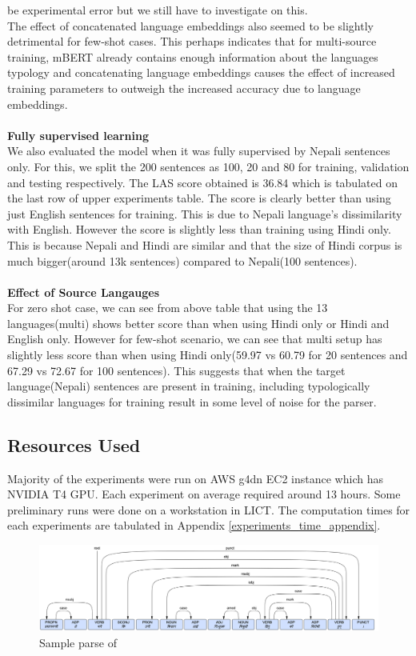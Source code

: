 be experimental error but we still have to investigate on this.
\\
The effect of concatenated language embeddings also seemed to be slightly
detrimental for few-shot cases. This perhaps indicates that for multi-source
training, mBERT already contains enough information about the languages
typology and concatenating language embeddings causes the effect of increased
training parameters to outweigh the increased accuracy due to language embeddings.
\\~\\
\textbf{Fully supervised learning}\\
We also evaluated the model when it was fully supervised by Nepali sentences
only.  For this, we split the 200 sentences as 100, 20 and 80 for training,
validation and testing respectively. The LAS score obtained is 36.84 which is
tabulated on the last row of upper experiments table. The score is clearly
better than using just English sentences for training. This is due to Nepali
language's dissimilarity with English. However the score is  slightly less than
training using Hindi only. This is because Nepali and Hindi are similar and
that the size of Hindi corpus is much bigger(around 13k sentences) compared to
Nepali(100 sentences).
\\~\\
\textbf{Effect of Source Langauges}\\
For zero shot case, we can see from above table that using the 13
languages(multi) shows better score than when using Hindi only or Hindi and
English only. However for few-shot scenario, we can see that multi setup has
slightly less score than when using Hindi only(59.97 vs 60.79 for 20 sentences
and 67.29 vs 72.67 for 100 sentences). This suggests that when the target
language(Nepali) sentences are present in training, including typologically
dissimilar languages for training result in some level of noise for the parser.

\subsection*{Resources Used}
Majority of the experiments were run on AWS g4dn EC2 instance which has NVIDIA
T4 GPU.  Each experiment on average required around 13 hours. Some preliminary
runs were done on a workstation in LICT. The computation times for each
experiments are tabulated in Appendix \ref{experiments_time_appendix}.

\begin{figure}[!h]
    \center
    \includegraphics[scale=0.1]{images/sample_result}
    \caption{Sample parse of }
    \label{img:sample_result1}
\end{figure}
